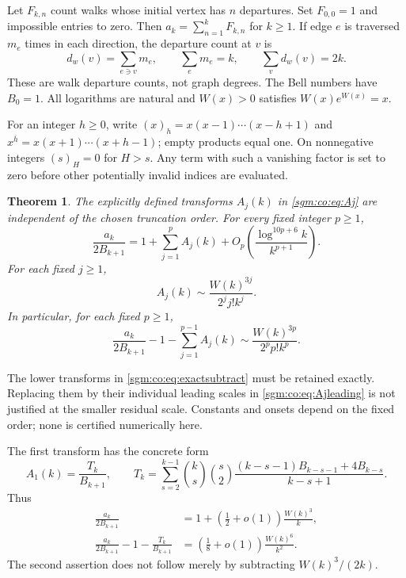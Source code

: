 \documentclass[11pt,letterpaper]{article}
\newtheorem{theorem}{Theorem}[section]
\theoremstyle{remark}\newtheorem{remark}[theorem]{Remark}
\theoremstyle{definition}\newtheorem{definition}[theorem]{Definition}
\begin{document}
Let $F_{k,n}$ count walks whose initial vertex has $n$ departures. Set $F_{0,0}=1$ and impossible entries to zero. Then $a_k=\sum_{n=1}^kF_{k,n}$ for $k\ge1$. If edge $e$ is traversed $m_e$ times in each direction, the departure count at $v$ is
\begin{equation}\label{sgm:co:eq:visits}
 d_w(v)=\sum_{e\ni v}m_e,\qquad \sum_e m_e=k,\qquad
 \sum_vd_w(v)=2k.
\end{equation}
These are walk departure counts, not graph degrees. The Bell numbers have $B_0=1$. All logarithms are natural and $W(x)>0$ satisfies $W(x)e^{W(x)}=x$.

For an integer $h\ge0$, write $(x)_h=x(x-1)\cdots(x-h+1)$ and $x^{\overline h}=x(x+1)\cdots(x+h-1)$; empty products equal one. On nonnegative integers $(s)_H=0$ for $H>s$. Any term with such a vanishing factor is set to zero before other potentially invalid indices are evaluated.

\begin{theorem}\label{sgm:co:thm:main}
The explicitly defined transforms $A_j(k)$ in \eqref{sgm:co:eq:Aj} are independent of the chosen truncation order. For every fixed integer $p\ge1$,
\begin{equation}\label{sgm:co:eq:expansion}
 \frac{a_k}{2B_{k+1}}=1+\sum_{j=1}^{p}A_j(k)
      +O_p\!\left(\frac{\log^{10p+6}k}{k^{p+1}}\right).
\end{equation}
For each fixed $j\ge1$,
\begin{equation}\label{sgm:co:eq:Ajleading}
 A_j(k)\sim\frac{W(k)^{3j}}{2^j j!k^j}.
\end{equation}
In particular, for each fixed $p\ge1$,
\begin{equation}\label{sgm:co:eq:exactsubtract}
 \frac{a_k}{2B_{k+1}}-1-\sum_{j=1}^{p-1}A_j(k)
 \sim\frac{W(k)^{3p}}{2^p p!k^p}.
\end{equation}
\end{theorem}
The lower transforms in \eqref{sgm:co:eq:exactsubtract} must be retained exactly. Replacing them by their individual leading scales in \eqref{sgm:co:eq:Ajleading} is not justified at the smaller residual scale. Constants and onsets depend on the fixed order; none is certified numerically here.

The first transform has the concrete form
\begin{equation}\label{sgm:co:eq:T1}
 A_1(k)=\frac{T_k}{B_{k+1}},\qquad
 T_k=\sum_{s=2}^{k-1}\binom ks\binom s2
 \frac{(k-s-1)B_{k-s-1}+4B_{k-s}}{k-s+1}.
\end{equation}
Thus
\begin{align}
 \frac{a_k}{2B_{k+1}}&=1+\left(\frac12+o(1)\right)\frac{W(k)^3}{k},\label{sgm:co:eq:firstscale}\\
 \frac{a_k}{2B_{k+1}}-1-\frac{T_k}{B_{k+1}}
 &=\left(\frac18+o(1)\right)\frac{W(k)^6}{k^2}.\label{sgm:co:eq:secondscale}
\end{align}
The second assertion does not follow merely by subtracting $W(k)^3/(2k)$.
\end{document}
